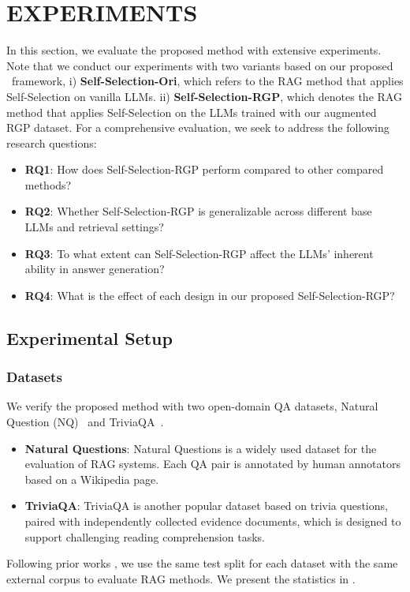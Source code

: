 

\section{EXPERIMENTS}
\label{sec:experiments}
In this section, we evaluate the proposed method with extensive experiments.
Note that we conduct our experiments with two variants based on our proposed \framework~framework,  i) \textbf{Self-Selection-Ori}, which refers to the RAG method that applies Self-Selection on vanilla LLMs. ii) \textbf{Self-Selection-RGP}, which denotes the RAG method that applies Self-Selection on the LLMs trained with our augmented RGP dataset.
For a comprehensive evaluation, we seek to address the following research questions:
\begin{itemize} 
\item \textbf{RQ1}: How does Self-Selection-RGP perform compared to other compared methods? 
\item \textbf{RQ2}: Whether Self-Selection-RGP is generalizable across different base LLMs and retrieval settings? 
\item \textbf{RQ3}: To what extent can Self-Selection-RGP affect the LLMs' inherent ability in answer generation? 
\item \textbf{RQ4}: What is the effect of each design in our proposed Self-Selection-RGP? 
\end{itemize}

\subsection{Experimental Setup}
\subsubsection{\textbf{Datasets}}
 We verify the proposed method with two open-domain QA datasets, Natural Question (NQ)~\cite{kwiatkowski2019natural} and TriviaQA~\cite{joshi2017triviaqa}.
\begin{itemize}[leftmargin=*,nosep]
    \item \textbf{Natural Questions}: Natural Questions is a widely used dataset for the evaluation of RAG systems. Each QA pair is annotated by human annotators based on a Wikipedia page.
    \item \textbf{TriviaQA}: TriviaQA is another popular dataset based on trivia questions, paired with independently collected evidence documents, which is designed to support challenging reading comprehension tasks.
\end{itemize}
Following prior works \cite{trivedi2023interleaving,jeong2024adaptive}, we use the same test split for each dataset with the same external corpus to evaluate RAG methods. 
We present the statistics in .  

